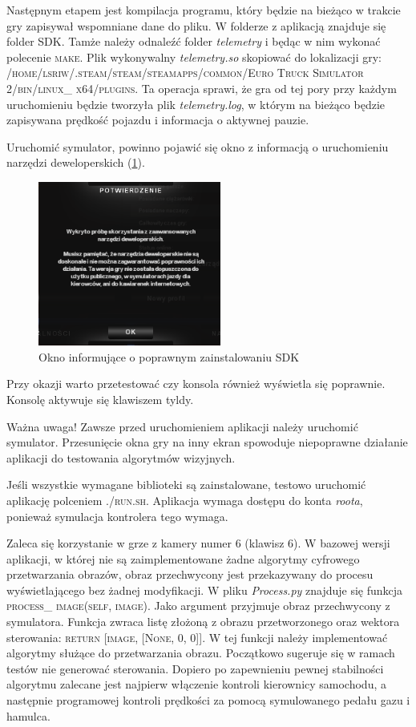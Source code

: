 Następnym etapem jest kompilacja programu, który będzie na bieżąco w trakcie gry zapisywał wspomniane dane do pliku. W folderze z aplikacją znajduje się folder SDK. Tamże należy odnaleźć folder \textit{telemetry} i będąc w nim wykonać polecenie \textsc{make}. Plik wykonywalny \textit{telemetry.so} skopiować do lokalizacji gry: \textsc{/home/lsriw/.steam/steam/steamapps/common/Euro Truck Simulator 2/bin/linux\_ x64/plugins}. Ta operacja sprawi, że gra od tej pory przy każdym uruchomieniu będzie tworzyła plik \textit{telemetry.log}, w którym na bieżąco będzie zapisywana prędkość pojazdu i informacja o aktywnej pauzie. 

Uruchomić symulator, powinno pojawić się okno z informacją o uruchomieniu narzędzi deweloperskich (\ref{fig:appendix1_dev_tools}).

\begin{figure}
  \centering
  \includegraphics[width=6cm]{img/appendix1_devtools.png}
  \caption{Okno informujące o poprawnym zainstalowaniu SDK}
  \label{fig:appendix1_dev_tools}
\end{figure}

Przy okazji warto przetestować czy konsola również wyświetla się poprawnie. Konsolę aktywuje się klawiszem tyldy.

Ważna uwaga! Zawsze przed uruchomieniem aplikacji należy uruchomić symulator. Przesunięcie okna gry na inny ekran spowoduje niepoprawne działanie aplikacji do testowania algorytmów wizyjnych.

Jeśli wszystkie wymagane biblioteki są zainstalowane, testowo uruchomić aplikację polceniem \textsc{./run.sh}. Aplikacja wymaga dostępu do konta \textit{roota}, ponieważ symulacja kontrolera tego wymaga.

Zaleca się korzystanie w grze z kamery numer 6 (klawisz 6).
W bazowej wersji aplikacji, w której nie są zaimplementowane żadne algorytmy cyfrowego przetwarzania obrazów, obraz przechwycony jest przekazywany do procesu wyświetlającego bez żadnej modyfikacji. W pliku \textit{Process.py} znajduje się funkcja \textsc{process\_ image(self, image)}. Jako argument przyjmuje obraz przechwycony z symulatora. Funkcja zwraca listę złożoną z obrazu przetworzonego oraz wektora sterowania: \textsc{return [image, [None, 0, 0]]}. W tej funkcji należy implementować algorytmy służące do przetwarzania obrazu. Początkowo sugeruje się w ramach testów nie generować sterowania. Dopiero po zapewnieniu pewnej stabilności algorytmu zalecane jest najpierw włączenie kontroli kierownicy samochodu, a następnie programowej kontroli prędkości za pomocą symulowanego pedału gazu i hamulca.

